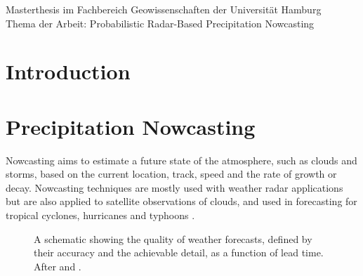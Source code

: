 \documentclass[11pt,twoside,a4paper,fleqn,x11names]{report}
\numberwithin{equation}{chapter}
\numberwithin{figure}{chapter}
\numberwithin{table}{chapter}
\begin{document}
	\newpage
	\thispagestyle{empty}
	\null
	\vfill
	Masterthesis im Fachbereich Geowissenschaften der Universität Hamburg\\
	Thema der Arbeit: \glqq Probabilistic Radar-Based Precipitation Nowcasting\grqq
	
	
\newpage
\renewcommand{\abstractname}{\huge \flushleft Abstract}
\begin{abstract}
\null
\end{abstract}
\thispagestyle{empty}
\pagestyle{empty}
\tableofcontents
\listoffigures
\listoftables
\newpage\pagestyle{fancy}
\chapter{Introduction}
\chapter{Precipitation Nowcasting}
\label{chap:nowcasting}
Nowcasting aims to estimate a future state of the atmosphere, such as clouds and storms, based on the current location, track, speed and the rate of growth or decay. Nowcasting techniques are mostly used with weather radar applications but are also applied to satellite observations of clouds, and used in forecasting for tropical cyclones, hurricanes and typhoons \citep{Sene2009}.

\begin{figure}[!htbp]
	\centering
	\caption{A schematic showing the quality of weather forecasts, defined by their accuracy and the achievable detail, as a function of lead time. After \cite{Pierce12} and \cite{Browning1980}.}
	\label{fig:prognosisquality}
\end{figure}
\end{document}

